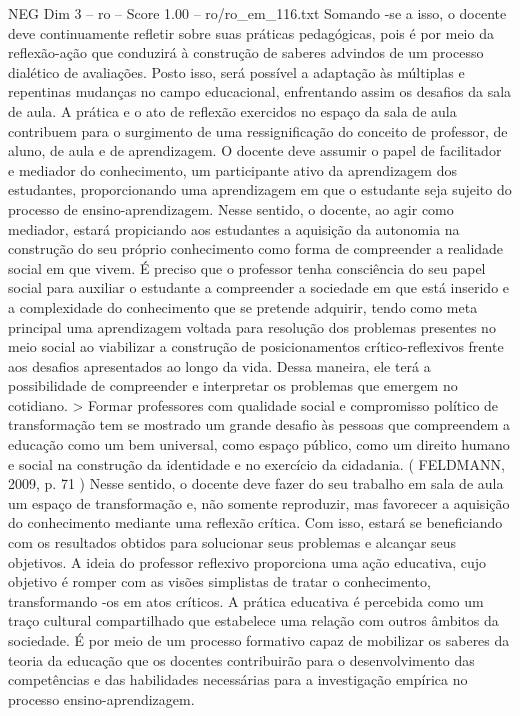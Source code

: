 \begin{textsample}{NEG Dim 3 – ro – Score 1.00 – ro/ro\_em\_116.txt}
Somando -se a isso, o docente deve continuamente refletir sobre suas práticas pedagógicas, pois é por meio da reflexão-ação que conduzirá à construção de saberes advindos de um processo dialético de avaliações.
Posto isso, será possível a adaptação às múltiplas e repentinas mudanças no campo educacional, enfrentando assim os desafios da sala de aula.
A prática e o ato de reflexão exercidos no espaço da sala de aula contribuem para o surgimento de uma ressignificação do conceito de professor, de aluno, de aula e de aprendizagem.
O docente deve assumir o papel de facilitador e mediador do conhecimento, um participante ativo da aprendizagem dos estudantes, proporcionando uma aprendizagem em que o estudante seja sujeito do processo de ensino-aprendizagem.
Nesse sentido, o docente, ao agir como mediador, estará propiciando aos estudantes a aquisição da autonomia na construção do seu próprio conhecimento como forma de compreender a realidade social em que vivem.
É preciso que o professor tenha consciência do seu papel social para auxiliar o estudante a compreender a sociedade em que está inserido e a complexidade do conhecimento que se pretende adquirir, tendo como meta principal uma aprendizagem voltada para resolução dos problemas presentes no meio social ao viabilizar a construção de posicionamentos crítico-reflexivos frente aos desafios apresentados ao longo da vida.
Dessa maneira, ele terá a possibilidade de compreender e interpretar os problemas que emergem no cotidiano. > Formar professores com qualidade social e compromisso político de transformação tem se mostrado um grande desafio às pessoas que compreendem a educação como um bem universal, como espaço público, como um direito humano e social na construção da identidade e no exercício da cidadania. ( FELDMANN, 2009, p. 71 ) Nesse sentido, o docente deve fazer do seu trabalho em sala de aula um espaço de transformação e, não somente reproduzir, mas favorecer a aquisição do conhecimento mediante uma reflexão crítica.
Com isso, estará se beneficiando com os resultados obtidos para solucionar seus problemas e alcançar seus objetivos.
A ideia do professor reflexivo proporciona uma ação educativa, cujo objetivo é romper com as visões simplistas de tratar o conhecimento, transformando -os em atos críticos.
A prática educativa é percebida como um traço cultural compartilhado que estabelece uma relação com outros âmbitos da sociedade.
É por meio de um processo formativo capaz de mobilizar os saberes da teoria da educação que os docentes contribuirão para o desenvolvimento das competências e das habilidades necessárias para a investigação empírica no processo ensino-aprendizagem.

\end{textsample}
